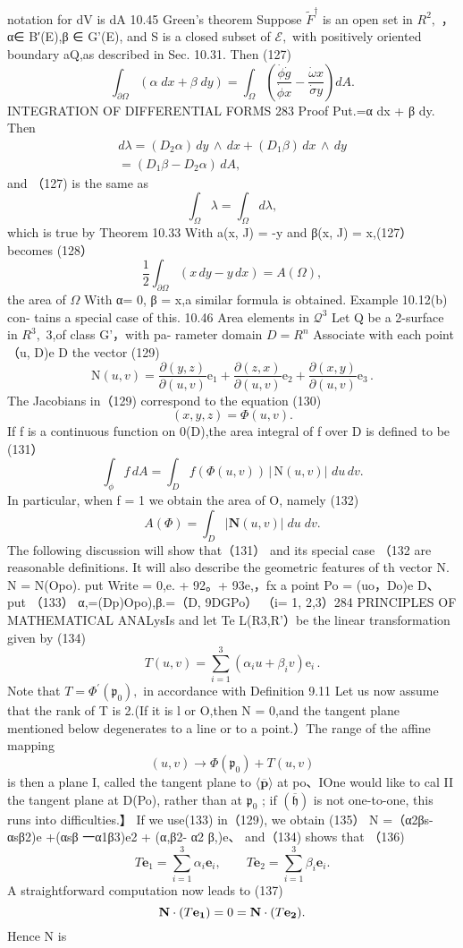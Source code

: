 notation for dV is dA 10.45 Green's theorem Suppose ${\widetilde{F}}^{\dagger}$ is an open set in $R^{2},$ ，α∈ B′(E),β ∈ G'(E), and S is a closed subset of ${\mathcal{E}},$ with positively oriented boundary aQ,as described in Sec. 10.31. Then (127) $$ \int_{\partial\Omega}(\alpha\;d x+\beta\;d y)=\int_{\Omega}\left({\frac{{\dot{\phi}}{\dot{g}}}{{\dot{\phi}}x}}-{\frac{{\dot{\omega}}x}{{\dot{\sigma}}y}}\right)d A. $$INTEGRATION OF DIFFERENTIAL FORMS 283 Proof Put.=α dx + β dy. Then $$ \begin{array}{c}{{d\lambda=(D_{2}\alpha)\,d y\,\wedge\,d x+(D_{1}\beta)\,d x\,\wedge\,d y}}\\ {{=(D_{1}\beta-D_{2}\alpha)\,d A,}}\end{array} $$ and （127) is the same as $$ \textstyle\int_{\Omega}\lambda=\int_{\Omega}d\lambda, $$ which is true by Theorem 10.33 With a(x, J) = -y and β(x, J) = x,(127） becomes (128） $$ \textstyle{\frac{1}{2}}\int_{\partial\Omega}(x\,d y-y\,d x)=A(\Omega), $$ the area of $\Omega$ With α= 0, β = x,a similar formula is obtained. Example 10.12(b) con- tains a special case of this. 10.46 Area elements in $\textstyle\mathcal{Q}^{3}$ Let Q be a 2-surface in $R^{3},$ 3,of class G'，with pa- rameter domain $\scriptstyle D=R^{n}$ Associate with each point （u, D)e D the vector (129) $$ \mathrm{N}(u,v)={\frac{\partial(y,z)}{\partial(u,v)}}\mathrm{e}_{1}+\frac{\partial(z,x)}{\partial(u,v)}\mathrm{e}_{2}+\frac{\partial(x,y)}{\partial(u,v)}\mathrm{e}_{3}\,. $$ The Jacobians in（129) correspond to the equation (130) $$ (x,y,z)=\Phi(u,v). $$ If f is a continuous function on 0(D),the area integral of f over D is defined to be (131） $$ \int_{\phi}f\,d A=\int_{D}f(\Phi(u,v))\,|\,\mathrm{N}(u,v)|\,\,d u\,d v. $$ In particular, when f = 1 we obtain the area of O, namely (132) $$ A(\Phi)=\int_{D}|\mathbf{N}(u,v)|\;d u\;d v. $$ The following discussion will show that（131） and its special case （132 are reasonable definitions. It will also describe the geometric features of th vector N. N = N(Opo). put Write = 0,e. + 92。+ 93e,，fx a point Po = (uo，Do)e D、 put （133） α,=(Dp)Opo),β.=（D, 9DGPo） （i= 1, 2,3）284 PRINCIPLES OF MATHEMATICAL ANALysIs and let Te L(R3,R'）be the linear transformation given by (134) $$ T(u,v)=\sum_{i=1}^{3}(\alpha_{i}u+\beta_{i}v)\mathrm{e}_{i}\,. $$ Note that $T=\Phi^{\prime}({\mathfrak{p}}_{0}),$ in accordance with Definition 9.11 Let us now assume that the rank of T is 2.(If it is l or O,then N = 0,and the tangent plane mentioned below degenerates to a line or to a point.）The range of the affine mapping $$ (u,v)\to\Phi({\mathfrak{p}}_{0})+T(u,v) $$ is then a plane I, called the tangent plane to $\langle{\overline{{\mathbf{p}}}}\rangle$ at po、IOne would like to cal II the tangent plane at D(Po), rather than at $\mathfrak{p}_{0}$ ; if $({\overline{{\mathfrak{h}}}})$ is not one-to-one, this runs into difficulties.】 If we use(133) in（129), we obtain (135） N =（α2βs-αsβ2)e +(αsβ 一α1β3)e2 + (α,β2- α2 β,)e、 and（134) shows that （136) $$ T\mathbf{e}_{1}=\sum_{i=1}^{3}\alpha_{i}\mathbf{e}_{i},\qquad T\mathbf{e}_{2}=\sum_{i=1}^{3}\beta_{i}\mathbf{e}_{i}. $$ A straightforward computation now leads to (137) $$ {\bf N}\cdot(T\mathbf{e_{1}})=0={\bf N}\cdot(T\mathbf{e_{2}}). $$ Hence N is 